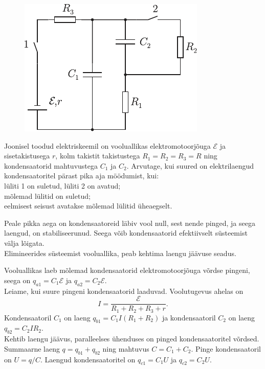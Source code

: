 
\begin{figure}
	\begin{center}
		\vspace{-25pt}
		\includegraphics[width=\linewidth]{2006-v2g-07-yl}
	\end{center}
\end{figure}
Joonisel toodud elektriskeemil on vooluallikas elektromotoorjõuga $\mathcal E$ ja sisetakistusega $r$, kolm takistit takistustega $R_1 = R_2 = R_3 = R$ ning kondensaatorid mahtuvustega $C_1$ ja $C_2$. Arvutage, kui suured on elektrilaengud kondensaatoritel pärast pika aja möödumist, kui:\\
\osa lüliti 1 on suletud, lüliti 2 on avatud;\\
\osa mõlemad lülitid on suletud;\\
\osa eelmisest seisust avatakse mõlemad lülitid üheaegselt. 

\hint
\osa\osa Peale pikka aega on kondensaatoreid läbiv vool null, sest nende pinged, ja seega laengud, on stabiliseerunud. Seega võib kondensaatorid efektiivselt süsteemist välja lõigata.\\
\osa Elimineerides süsteemist vooluallika, peab kehtima laengu jäävuse seadus.

\solu
\osa Vooluallikas laeb mõlemad kondensaatorid elektromotoorjõuga võrdse pingeni, seega on $q_{a1} = C_1\mathcal E$ ja $q_{a2} = C_2\mathcal E$.\\
\osa Leiame, kui suure pingeni kondensaatorid laaduvad. Voolutugevus ahelas
on
\[
I = \frac{\mathcal E}{R_1+R_2+R_3+r}.
\]
Kondensaatoril $C_1$ on laeng $q_{b1} = C_1I(R_1 + R_2)$ ja kondensaatoril $C_2$ on laeng $q_{b2} = C_2IR_2$.\\
\osa Kehtib laengu jäävus, paralleelses ühenduses on pinged kondensaatoritel võrdsed. Summaarne laeng $q = q_{b1} + q_{b2}$ ning mahtuvus $C = C_1 + C_2$. Pinge kondensaatoril on $U = q/C$. Laengud kondensaatoritel on $q_{c1} = C_1U$ ja $q_{c2} = C_2U$.
\probend